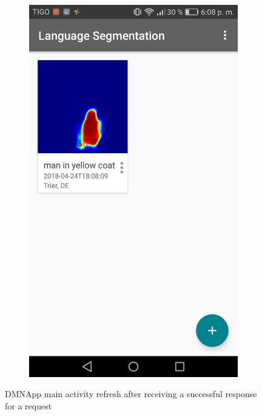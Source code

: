 \begin{figure}[!htbp]
\begin{multicols}{2}
    \begin{subfigure}[b]{\columnwidth}
            \centering
            \includegraphics[width=\textwidth]{./figures/dmn_app/views/7.png}
    \label{subfig:mask_preview}
    \end{subfigure}
    \end{multicols}
    
    \caption{DMNApp main activity refresh after receiving a successful response for a request}
    \label{Fig:Main_Elem}
\end{figure}

